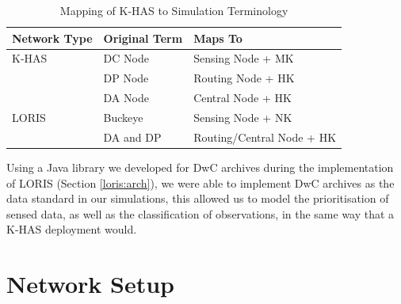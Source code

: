 	\begin{table}[h]
	\centering
	\begin{tabular}{|l|l|l|}
	\hline
	\textbf{Network Type} & \textbf{Original Term} & \textbf{Maps To}          \\
	\hline
	K-HAS                 & DC Node                & Sensing Node + MK         \\
	                      & DP Node                & Routing Node + HK         \\
	                      & DA Node                & Central Node + HK         \\
	LORIS                 & Buckeye                & Sensing Node + NK         \\
	                      & DA and DP              & Routing/Central Node + HK \\
	\hline
	\end{tabular}
	\caption{Mapping of K-HAS to Simulation Terminology}
	\label{sim:tab:terms}
	\end{table}

Using a Java library we developed for DwC archives during the implementation of LORIS (Section \ref{loris:arch}), we were able to implement DwC archives as the data standard in our simulations, this allowed us to model the prioritisation of sensed data, as well as the classification of observations, in the same way that a K-HAS deployment would.

\section{Network Setup}\label{sim:setup}


